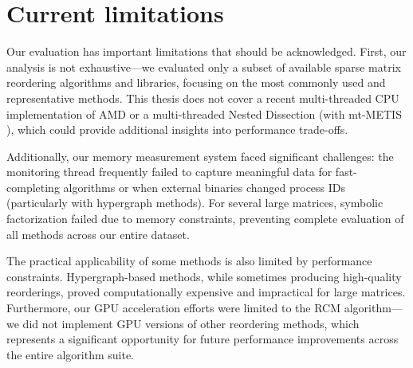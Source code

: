 \section{Current limitations}

Our evaluation has important limitations that should be acknowledged. First, our analysis is not exhaustive—we evaluated only a subset of available sparse matrix reordering algorithms and libraries, focusing on the most commonly used and representative methods. This thesis does not cover a recent multi-threaded CPU implementation of AMD \cite{chang2025parallelizingapproximateminimumdegree} or a multi-threaded Nested Dissection (with mt-METIS \cite{mtmetis2013ipdps}), which could provide additional insights into performance trade-offs.

Additionally, our memory measurement system faced significant challenges: the monitoring thread frequently failed to capture meaningful data for fast-completing algorithms or when external binaries changed process IDs (particularly with hypergraph methods). For several large matrices, symbolic factorization failed due to memory constraints, preventing complete evaluation of all methods across our entire dataset.

The practical applicability of some methods is also limited by performance constraints. Hypergraph-based methods, while sometimes producing high-quality reorderings, proved computationally expensive and impractical for large matrices. Furthermore, our GPU acceleration efforts were limited to the RCM algorithm—we did not implement GPU versions of other reordering methods, which represents a significant opportunity for future performance improvements across the entire algorithm suite.


